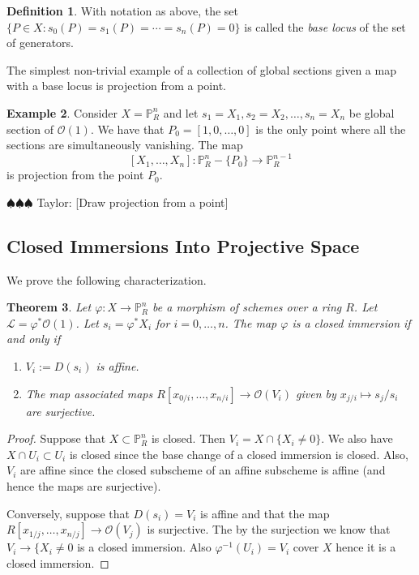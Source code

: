 \documentclass[12pt]{article}
\numberwithin{equation}{section}
\newtheorem{theorem}{Theorem}[subsection]
\theoremstyle{definition}
\newtheorem{definition}[theorem]{Definition}
\newtheorem{example}[theorem]{Example}
\theoremstyle{remark}
\newcommand{\Ocal}{\mathcal{O}}
\newcommand{\PP}{\mathbb{P}}
\newcommand{\Lcal}{\mathcal{L}}
\newcommand{\taylor}[1]{{\color{blue} \sf $\spadesuit\spadesuit\spadesuit$ Taylor: [#1]}}
\begin{document}
\begin{definition}
	With notation as above, the set $\lbrace P \in X \colon s_0(P)=s_1(P)=\cdots =s_n(P) =0 \rbrace $ is called the \emph{base locus} of the set of generators.
\end{definition}


The simplest non-trivial example of a collection of global sections given a map with a base locus is projection from a point. 
\begin{example}
	Consider $X = \PP^n_R$ and let $s_1 = X_1, s_2=X_2, \ldots, s_n = X_n$ be global section of $\Ocal(1)$.
	We have that $P_0 = [1,0,\ldots,0]$ is the only point where all the sections are simultaneously vanishing. 
	The map 
	$$ [X_1,\ldots,X_n] \colon \PP^n_R - \lbrace P_0 \rbrace \to \PP^{n-1}_R $$
	is projection from the point $P_0$.
\end{example}
\taylor{Draw projection from a point}

\subsection{Closed Immersions Into Projective Space}
We prove the following characterization.
\begin{theorem}
	Let $\varphi: X \to \PP^n_R$ be a morphism of schemes over a ring $R$. 
	Let $\Lcal = \varphi^*\Ocal(1)$. 
	Let $s_i = \varphi^*X_i$ for $i=0,\ldots,n$. 
	The map $\varphi$ is a closed immersion if and only if
	\begin{enumerate}
		\item $V_i:=D(s_i)$ is affine. 
		\item The map associated maps $R[x_{0/i},\ldots,x_{n/i}] \to \Ocal(V_i)$ given by $x_{j/i} \mapsto s_j/s_i$ are surjective.
	\end{enumerate}
\end{theorem}
\begin{proof}
	Suppose that $X \subset \PP^n_R$ is closed. 
	Then $V_i = X \cap \lbrace X_i \neq 0 \rbrace$. 
	We also have $X \cap U_i \subset U_i$ is closed since the base change of a closed immersion is closed. 
	Also, $V_i$ are affine since the closed subscheme of an affine subscheme is affine (and hence the maps are surjective).
	
	Conversely, suppose that $D(s_i) = V_i$ is affine and that the map $R[x_{1/j},\ldots,x_{n/j}] \to \Ocal(V_j)$ is surjective. 
	The by the surjection we know that $V_i \to \lbrace X_i \neq 0$ is a closed immersion. 
	Also $\varphi^{-1}(U_i) = V_i$ cover $X$ hence it is a closed immersion.
\end{proof}
\end{document}
